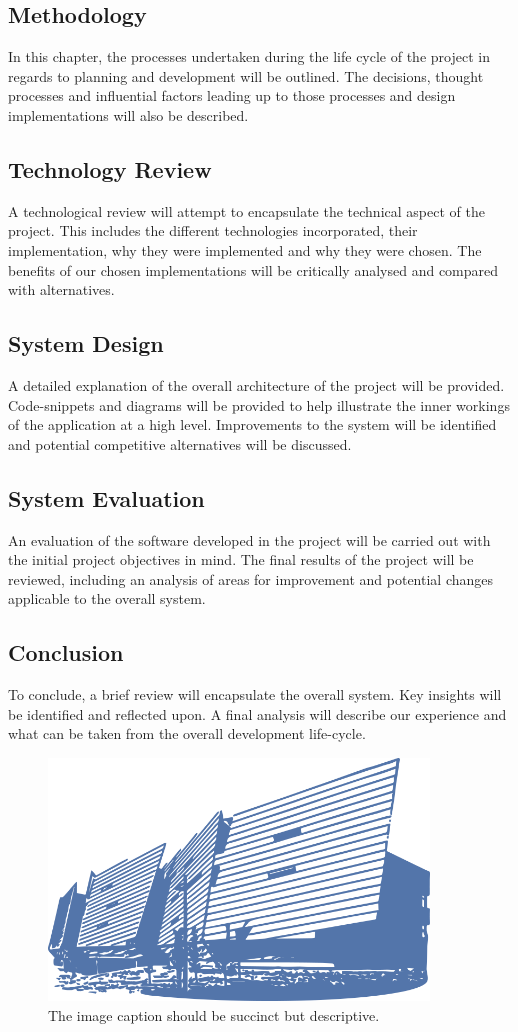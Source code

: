 \subsection{Methodology}
In this chapter, the processes undertaken during the life cycle of the project in regards to planning and development will be outlined. The decisions, thought processes and influential factors leading up to those processes and design implementations will also be described.
\subsection{Technology Review}
A technological review will attempt to encapsulate the technical aspect of the project. This includes the different technologies incorporated, their implementation, why they were implemented and why they were chosen. The benefits of our chosen implementations will be critically analysed and compared with alternatives.
\subsection{System Design}
A detailed explanation of the overall architecture of the project will be provided. Code-snippets and diagrams will be provided to help illustrate the inner workings of the application at a high level. Improvements to the system will be identified and potential competitive alternatives will be discussed.
\subsection{System Evaluation}
An evaluation of the software developed in the project will be carried out with the initial project objectives in mind. The final results of the project will be reviewed, including an analysis of areas for improvement and potential changes applicable to the overall system.
\subsection{Conclusion}
To conclude, a brief review will encapsulate the overall system. Key insights will be identified and reflected upon. A final analysis will describe our experience and what can be taken from the overall development life-cycle.

\begin{figure}[h!]
	\caption{The image caption should be succinct but descriptive.}
	\label{image:myImageName}
	\centering
	\includegraphics[width=0.9\textwidth]{images/gmit-building.png}
\end{figure}	